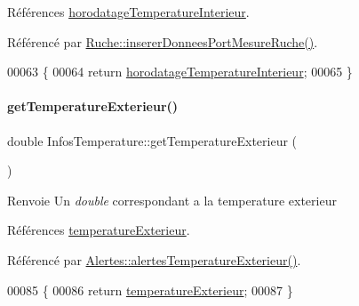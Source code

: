 Références \hyperlink{class_infos_temperature_ad4c62d479b8897102a59025a56d7b4c6}{horodatage\+Temperature\+Interieur}.



Référencé par \hyperlink{class_ruche_aa61f6dd8b15e5242ef3a3bdd87cca4a3}{Ruche\+::inserer\+Donnees\+Port\+Mesure\+Ruche()}.


\begin{DoxyCode}
00063 \{
00064     \textcolor{keywordflow}{return} \hyperlink{class_infos_temperature_ad4c62d479b8897102a59025a56d7b4c6}{horodatageTemperatureInterieur};
00065 \}
\end{DoxyCode}
\mbox{\label{class_infos_temperature_aebb00308151b8b6319732b62bd7b4b55}} 
\paragraph{\texorpdfstring{get\+Temperature\+Exterieur()}{getTemperatureExterieur()}}
{\footnotesize\ttfamily double Infos\+Temperature\+::get\+Temperature\+Exterieur (\begin{DoxyParamCaption}{ }\end{DoxyParamCaption})}

\begin{DoxyReturn}{Renvoie}
Un {\itshape double} correspondant a la temperature exterieur 
\end{DoxyReturn}


Références \hyperlink{class_infos_temperature_af80286a5b0e05d0379f53c0ebbc7d483}{temperature\+Exterieur}.



Référencé par \hyperlink{class_alertes_a91fb2665fa8b6c32c74bfe4d1b89a2d8}{Alertes\+::alertes\+Temperature\+Exterieur()}.


\begin{DoxyCode}
00085 \{
00086     \textcolor{keywordflow}{return} \hyperlink{class_infos_temperature_af80286a5b0e05d0379f53c0ebbc7d483}{temperatureExterieur};
00087 \}
\end{DoxyCode}
\mbox{\label{class_infos_temperature_aaf4cb4fd8a7c46d14955d3175498f91c}} 
